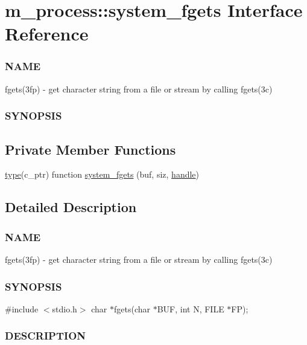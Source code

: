 \hypertarget{interfacem__process_1_1system__fgets}{}\section{m\+\_\+process\+:\+:system\+\_\+fgets Interface Reference}
\label{interfacem__process_1_1system__fgets}


\subsubsection*{N\+A\+ME}

fgets(3fp) -\/ get character string from a file or stream by calling fgets(3c) \subsubsection*{S\+Y\+N\+O\+P\+S\+IS} 


\subsection*{Private Member Functions}
\begin{DoxyCompactItemize}
\item 
\hyperlink{stop__watch_83_8txt_a70f0ead91c32e25323c03265aa302c1c}{type}(c\+\_\+ptr) function \hyperlink{interfacem__process_1_1system__fgets_a33f5f4ba1ea0fe4e0b757d7fa5e8a571}{system\+\_\+fgets} (buf, siz, \hyperlink{leave__watchgroup_83_8txt_ad6c5ebd26f707ef8da754021612a7c8d}{handle})
\end{DoxyCompactItemize}


\subsection{Detailed Description}
\subsubsection*{N\+A\+ME}

fgets(3fp) -\/ get character string from a file or stream by calling fgets(3c) \subsubsection*{S\+Y\+N\+O\+P\+S\+IS}

\#include $<$stdio.\+h$>$ char $\ast$fgets(char $\ast$\+B\+UF, int N, F\+I\+LE $\ast$\+FP); \subsubsection*{D\+E\+S\+C\+R\+I\+P\+T\+I\+ON}


